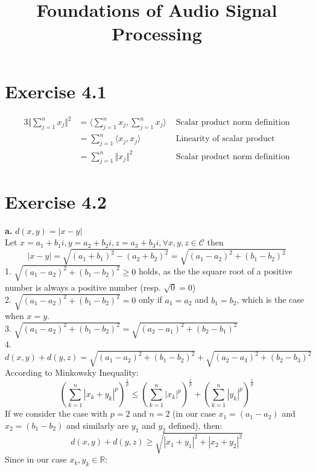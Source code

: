 \documentclass[12pt]{article}
\title{Foundations of Audio Signal Processing\\ \ass}
\author{\auth}
\begin{document}
	\maketitle
	\section*{Exercise 4.1}
	\begin{alignat*}{3}
	\Vert \sum_{j=1}^{n} x_j\Vert^2 &= \langle\sum_{j=1}^{n} x_j, \sum_{j=1}^{n} x_j\rangle & \text{ Scalar product norm definition}\\
	&=\sum_{j=1}^{n} \langle x_j, x_j\rangle & \text{ Linearity of scalar product}\\
	&=\sum_{j=1}^{n} \Vert x_j \Vert^2 & \text{ Scalar product norm definition}
	\end{alignat*}
	\section*{Exercise 4.2}
	\textbf{a.} $d(x,y) = \vert x - y \vert$\\
	Let $x = a_1 + b_1 i, y = a_2 + b_2 i, z = a_3 + b_3 i, \forall x, y, z \in \mathcal{C} $ then
	\begin{equation*}
		\vert x - y \vert = \sqrt{(a_1 + b_1)^2 - (a_2 + b_2)^2} = \sqrt{(a_1 - a_
			2)^2 + (b_1 - b_2)^2}
	\end{equation*}
	1. $\sqrt{(a_1 - a_2)^2 + (b_1 - b_2)^2} \geq 0$ holds, as the the square root of a positive number is always a positive number (resp. $\sqrt0 = 0$)\\
	2. $\sqrt{(a_1 - a_2)^2 + (b_1 - b_2)^2} = 0$ only if $a_1 = a_2$ and $b_1 = b_2$, which is the case when $x=y$.\\
	3. $\sqrt{(a_1 - a_2)^2 + (b_1 - b_2)^2} = \sqrt{(a_2 - a_1)^2 + (b_2 - b_1)^2}$\\
	4. $d(x,y) + d(y,z) = \sqrt{(a_1 - a_2)^2 + (b_1 - b_2)^2} + \sqrt{(a_2 - a_3)^2 + (b_2 - b_3)^2}$
	According to Minkowsky Inequality:
	\begin{equation*}
	\left(\sum _{{k=1}}^{n}|x_{k}+y_{k}|^{p}\right)^{{{\frac  {1}{p}}}}\leq \left(\sum _{{k=1}}^{n}|x_{k}|^{p}\right)^{{{\frac  {1}{p}}}}+\left(\sum _{{k=1}}^{n}|y_{k}|^{p}\right)^{{{\frac  {1}{p}}}}
	\end{equation*}
	If we consider the case with $p=2$ and $n=2$ (in our case $x_1 = (a_1 - a_2)$ and $x_2 = (b_1 - b_2)$ and similarly are $y_1$ and $y_2$ defined), then:
	$$d(x,y) + d(y,z) \geq \sqrt{|x_1 + y_1|^2 + |x_2 + y_2|^2}  $$
	Since in our case $x_k,y_k \in \mathbb{R}$:
\end{document}
